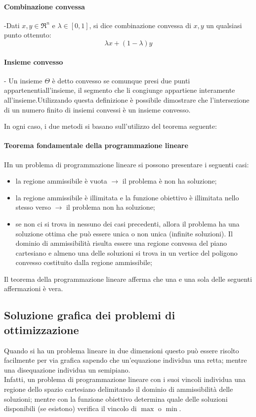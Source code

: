 \documentclass{article}
\begin{document}
\paragraph{Combinazione convessa}
  -Dati $x,y\in \Re^n$ e $\lambda \in [0,1]$, si dice combinazione convessa 
  di $x,y$ un qualsiasi punto ottenuto:$$\lambda x + (1-\lambda)y$$
  

\paragraph {Insieme convesso}
-  Un insieme $\Theta$ è detto convesso se comunque presi due punti
  appartenentiall'insieme, il segmento che li congiunge appartiene interamente
  all’insieme.Utilizzando questa definizione è possibile dimostrare che
  l’intersezione di un numero finito di insiemi convessi è un insieme
  convesso.


In ogni caso, i due metodi si basano sull'utilizzo del teorema seguente:

\paragraph{Teorema fondamentale della programmazione lineare}
  IIn un problema di programmazione lineare si possono presentare i seguenti 
  casi:
  \begin{itemize}
    \item la regione ammissibile è vuota $\rightarrow$ il problema è non ha 
      soluzione;
    \item la regione ammissibile è illimitata e la funzione obiettivo è
      illimitata nello stesso verso $\rightarrow$ il problema non ha soluzione;
    \item se non ci si trova in nessuno dei casi precedenti, allora il problema 
      ha una soluzione ottima che può essere unica o non unica (infinite 
      soluzioni). Il dominio di ammissibilità risulta essere 
      una regione convessa del piano cartesiano e almeno una delle soluzioni si 
      trova in un vertice del poligono convesso costituito dalla regione
      ammissibile;
  \end{itemize}
  Il teorema della programmazione lineare afferma che una e una sola delle 
  seguenti affermazioni è vera.

\subsection{Soluzione grafica dei problemi di ottimizzazione}
Quando si ha un problema lineare in due dimensioni questo può essere risolto 
facilmente per via grafica sapendo che un'equazione individua una retta; mentre
una disequazione individua un semipiano.\\ 
Infatti, un problema di programmazione lineare con i suoi vincoli individua 
una regione dello spazio cartesiano delimitando il dominio di ammissibilità 
delle soluzioni; mentre con la funzione obiettivo determina quale delle 
soluzioni disponibili (se esistono) verifica il vincolo di $\max$ o $\min$.\\ 
\end{document}

